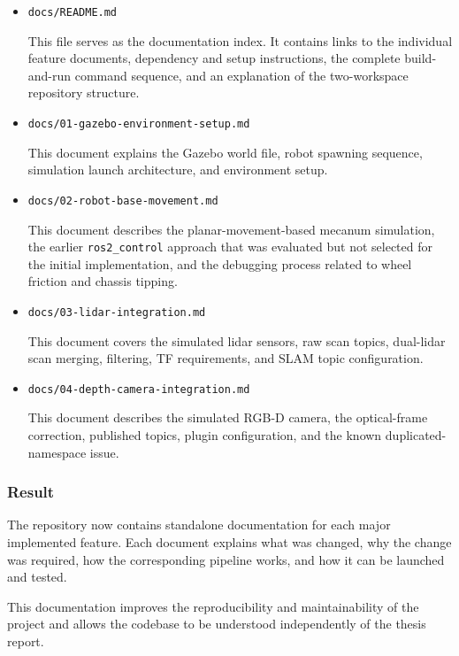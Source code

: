 \documentclass{article}
\begin{document}
\begin{itemize}
    \item \texttt{docs/README.md}

    This file serves as the documentation index. It contains links to the individual feature documents, dependency and setup instructions, the complete build-and-run command sequence, and an explanation of the two-workspace repository structure.

    \item \texttt{docs/01-gazebo-environment-setup.md}

    This document explains the Gazebo world file, robot spawning sequence, simulation launch architecture, and environment setup.

    \item \texttt{docs/02-robot-base-movement.md}

    This document describes the planar-movement-based mecanum simulation, the earlier \texttt{ros2\_control} approach that was evaluated but not selected for the initial implementation, and the debugging process related to wheel friction and chassis tipping.

    \item \texttt{docs/03-lidar-integration.md}

    This document covers the simulated lidar sensors, raw scan topics, dual-lidar scan merging, filtering, TF requirements, and SLAM topic configuration.

    \item \texttt{docs/04-depth-camera-integration.md}

    This document describes the simulated RGB-D camera, the optical-frame correction, published topics, plugin configuration, and the known duplicated-namespace issue.
\end{itemize}

\subsubsection{Result}

The repository now contains standalone documentation for each major implemented feature. Each document explains what was changed, why the change was required, how the corresponding pipeline works, and how it can be launched and tested.

This documentation improves the reproducibility and maintainability of the project and allows the codebase to be understood independently of the thesis report.
\end{document}
